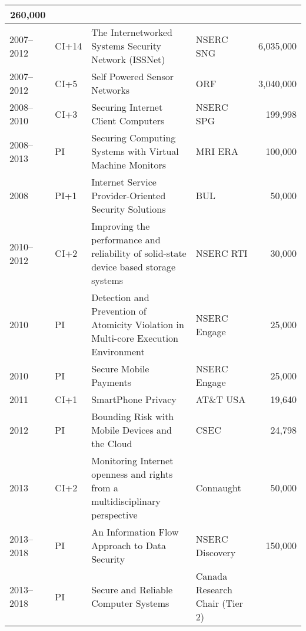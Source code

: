 \documentclass[10pt]{article}
\newenvironment{lonelist}[1][\enskip\textbullet]%
        {\vspace{-\baselineskip}\begin{list}{#1}{%
        \setlength{\partopsep}{0pt}%
        \setlength{\topsep}{0pt}
	\setlength{\leftmargin}{0pt}}}
        {\end{list}\vspace{-.6\baselineskip}}
\begin{document}
\begin{lonelist}
\begin{longtable}[h]{@{}|p{30pt}|p{6pt}|p{125pt}|p{65pt}|p{30pt}|}
\multicolumn{1}{|r|}{260,000} \\ \hline
2007--2012 & CI+14 & The Internetworked Systems Security Network
(ISSNet) & NSERC SNG & 
\multicolumn{1}{|r|}{6,035,000} \\ \hline
2007--2012 & CI+5 & Self Powered Sensor Networks & ORF & 
\multicolumn{1}{|r|}{3,040,000} \\ \hline
2008--2010 & CI+3 & Securing Internet Client Computers & NSERC SPG &
\multicolumn{1}{|r|}{199,998} \\ \hline
2008--2013 & PI & Securing Computing Systems with Virtual Machine
Monitors & MRI ERA & 
\multicolumn{1}{|r|}{100,000} \\ \hline
2008 & PI+1 & Internet Service Provider-Oriented Security Solutions &
BUL & 
\multicolumn{1}{|r|}{50,000} \\ \hline
2010--2012 & CI+2 & Improving the performance and reliability of
solid-state device based storage systems & NSERC RTI & 
\multicolumn{1}{|r|}{30,000} \\ \hline
2010 & PI & Detection and Prevention of Atomicity Violation in
Multi-core Execution Environment & NSERC Engage & 
\multicolumn{1}{|r|}{25,000} \\ \hline
2010 & PI & Secure Mobile Payments & NSERC Engage & 
\multicolumn{1}{|r|}{25,000} \\ \hline
2011 & CI+1 & SmartPhone Privacy & AT\&T USA & 
\multicolumn{1}{|r|}{19,640} \\ \hline
2012 & PI & Bounding Risk with Mobile Devices and the Cloud & CSEC & 
\multicolumn{1}{|r|}{24,798} \\ \hline
2013 & CI+2 & Monitoring Internet openness and rights from a multidisciplinary perspective & Connaught &  
\multicolumn{1}{|r|}{50,000} \\ \hline
2013--2018 & PI & An Information Flow Approach to Data Security & NSERC Discovery & 
\multicolumn{1}{|r|}{150,000} \\ \hline
2013--2018 & PI & Secure and Reliable Computer Systems & Canada Research Chair (Tier 2) & 

\end{longtable}
\end{lonelist}
\end{document}
